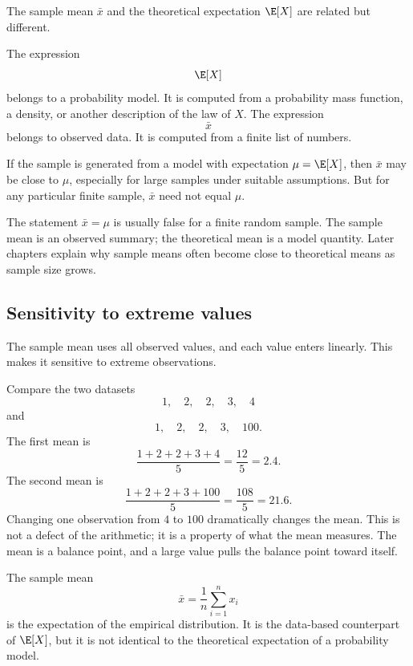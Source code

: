 The sample mean \(\bar{x}\) and the theoretical expectation \(\E[X]\) are related
but different.

The expression
\[
\E[X]
\]
belongs to a probability model. It is computed from a probability mass function,
a density, or another description of the law of \(X\). The expression
\[
\bar{x}
\]
belongs to observed data. It is computed from a finite list of numbers.

If the sample is generated from a model with expectation \(\mu=\E[X]\), then
\(\bar{x}\) may be close to \(\mu\), especially for large samples under suitable
assumptions. But for any particular finite sample, \(\bar{x}\) need not equal
\(\mu\).

\begin{remarkbox}
The statement \(\bar{x}=\mu\) is usually false for a finite random sample. The
sample mean is an observed summary; the theoretical mean is a model quantity.
Later chapters explain why sample means often become close to theoretical means
as sample size grows.
\end{remarkbox}

\subsection*{Sensitivity to extreme values}

The sample mean uses all observed values, and each value enters linearly. This
makes it sensitive to extreme observations.

Compare the two datasets
\[
1,\quad 2,\quad 2,\quad 3,\quad 4
\]
and
\[
1,\quad 2,\quad 2,\quad 3,\quad 100.
\]
The first mean is
\[
\frac{1+2+2+3+4}{5}=\frac{12}{5}=2.4.
\]
The second mean is
\[
\frac{1+2+2+3+100}{5}=\frac{108}{5}=21.6.
\]
Changing one observation from \(4\) to \(100\) dramatically changes the mean.
This is not a defect of the arithmetic; it is a property of what the mean
measures. The mean is a balance point, and a large value pulls the balance point
toward itself.

\begin{summarybox}
The sample mean
\[
\bar{x}=\frac1n\sum_{i=1}^n x_i
\]
is the expectation of the empirical distribution. It is the data-based
counterpart of \(\E[X]\), but it is not identical to the theoretical expectation
of a probability model.
\end{summarybox}

